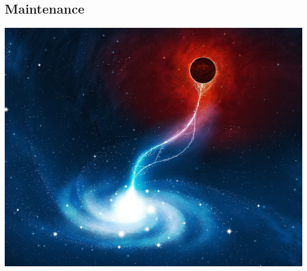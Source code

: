 \documentclass{article}
\begin{document}
\subsection{Maintenance}

\newpage
\includegraphics[width=\textwidth]{images/2wall.jpg}
\end{document}
